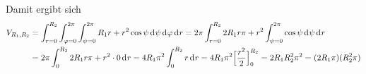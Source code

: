 \documentclass[../full]{subfiles}
\begin{document}
    Damit ergibt sich
    \begin{align*}
        V_{R_1, R_2} &
        = \int_{r = 0}^{R_2}
            \int_{\varphi = 0}^{2 \pi}
                \int_{\psi = 0}^{2 \pi} R_1 r + r^2 \cos \psi \dx[\psi]
            \dx[\varphi]
        \dx[r]
        = 2 \pi \int_{r = 0}^{R_2}
            2 R_1 r \pi + r^2 \int_{\psi = 0}^{2 \pi}
                \cos \psi
            \dx[\psi]
        \dx[r]
        \\ &
        = 2 \pi \int_0^{R_2} 2 R_1 r \pi + r^2 \cdot 0 \dx[r]
        = 4 R_1 \pi^2 \int_0^{R_2} r \dx[r]
        = 4 R_1 \pi^2 \FunctionBounds{\frac{r^2}{2}}{0}{R_2}
        = 2 R_1 R_2^2 \pi^2
        = \paren{2 R_1 \pi} \paren{R_2^2 \pi}
    \end{align*}
\end{document}
